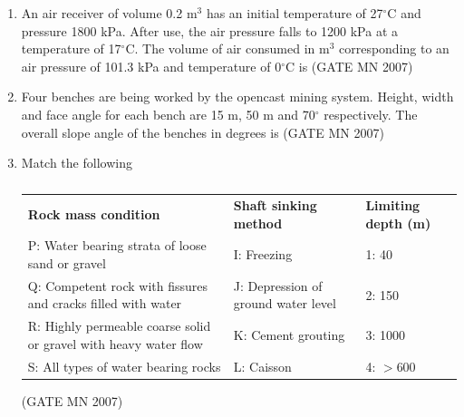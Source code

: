 \documentclass[journal]{IEEEtran}
\begin{document}
\begin{enumerate}
\item An air receiver of volume 0.2 m$^3$ has an initial temperature of 27$^\circ$C and pressure 1800 kPa. After use, the air pressure falls to 1200 kPa at a temperature of 17$^\circ$C. The volume of air consumed in m$^3$ corresponding to an air pressure of 101.3 kPa and temperature of 0$^\circ$C is  
	\hfill (GATE MN 2007)
\begin{enumerate}
\end{enumerate}


\item Four benches are being worked by the opencast mining system. Height, width and face angle for each bench are 15 m, 50 m and 70$^\circ$ respectively. The overall slope angle of the benches in degrees is  
	\hfill (GATE MN 2007)
\begin{enumerate}
\end{enumerate}


\item Match the following
\begin{table}[H]
    \centering\normalsize
\begin{tabular}{p{4.5cm} p{4.5cm} p{4cm}}
\textbf{Rock mass condition} & \textbf{Shaft sinking method} & \textbf{Limiting depth (m)} \\
P: Water bearing strata of loose sand or gravel & I: Freezing & 1: 40 \\
Q: Competent rock with fissures and cracks filled with water & J: Depression of ground water level & 2: 150 \\
R: Highly permeable coarse solid or gravel with heavy water flow & K: Cement grouting & 3: 1000 \\
S: All types of water bearing rocks & L: Caisson & 4: $>$600 \\
\end{tabular}
\caption*{}
    \label{tab:Q47}
\end{table}
\hfill (GATE MN 2007)
\begin{enumerate}
\end{enumerate}



\end{enumerate}
\end{document}

